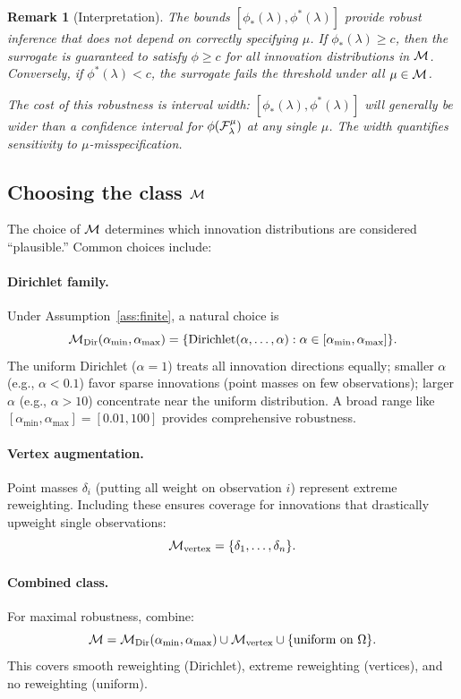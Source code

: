 \documentclass{article}
\newtheorem{remark}{Remark}
\begin{document}
\begin{remark}[Interpretation]
The bounds $[\phi_*(\lambda), \phi^*(\lambda)]$ provide \emph{robust inference} that does not depend on correctly specifying $\mu$. If $\phi_*(\lambda) \geq c$, then the surrogate is guaranteed to satisfy $\phi \geq c$ for \emph{all} innovation distributions in $\mathcal{M}$. Conversely, if $\phi^*(\lambda) < c$, the surrogate fails the threshold under all $\mu \in \mathcal{M}$.

The cost of this robustness is interval width: $[\phi_*(\lambda), \phi^*(\lambda)]$ will generally be wider than a confidence interval for $\phi(\mathcal{F}_\lambda^\mu)$ at any single $\mu$. The width quantifies sensitivity to $\mu$-misspecification.
\end{remark}

\subsection{Choosing the class $\mathcal{M}$}

The choice of $\mathcal{M}$ determines which innovation distributions are considered ``plausible.'' Common choices include:

\paragraph{Dirichlet family.}
Under Assumption~\ref{ass:finite}, a natural choice is
\[
    \mathcal{M}_{\text{Dir}}(\alpha_{\min}, \alpha_{\max}) = \{\text{Dirichlet}(\alpha, \ldots, \alpha) : \alpha \in [\alpha_{\min}, \alpha_{\max}]\}.
\]
The uniform Dirichlet ($\alpha = 1$) treats all innovation directions equally; smaller $\alpha$ (e.g., $\alpha < 0.1$) favor sparse innovations (point masses on few observations); larger $\alpha$ (e.g., $\alpha > 10$) concentrate near the uniform distribution. A broad range like $[\alpha_{\min}, \alpha_{\max}] = [0.01, 100]$ provides comprehensive robustness.

\paragraph{Vertex augmentation.}
Point masses $\delta_i$ (putting all weight on observation $i$) represent extreme reweighting. Including these ensures coverage for innovations that drastically upweight single observations:
\[
    \mathcal{M}_{\text{vertex}} = \{\delta_1, \ldots, \delta_n\}.
\]

\paragraph{Combined class.}
For maximal robustness, combine:
\[
    \mathcal{M} = \mathcal{M}_{\text{Dir}}(\alpha_{\min}, \alpha_{\max}) \cup \mathcal{M}_{\text{vertex}} \cup \{\text{uniform on } \Omega\}.
\]
This covers smooth reweighting (Dirichlet), extreme reweighting (vertices), and no reweighting (uniform).
\end{document}
